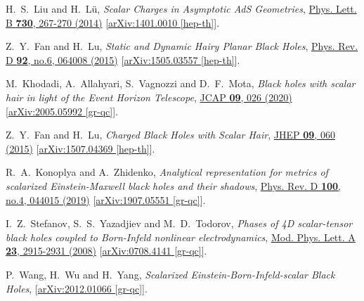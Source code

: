\documentclass[pr, twocolumn, preprintnumbers, showpacs,footnoteadded, superscriptaddress,nofootinbib,longbibliography]{revtex4-1}
\begin{document}
\begin{thebibliography}{99}
H.~S.~Liu and H.~L\"u,
\emph{Scalar Charges in Asymptotic AdS Geometries},
\href{https://www.sciencedirect.com/science/article/pii/S0370269314000781?via3Dihub}{Phys. Lett. B \textbf{730}, 267-270 (2014)}
[\href{https://arxiv.org/pdf/1401.0010.pdf}{arXiv:1401.0010 [hep-th]}].

Z.~Y.~Fan and H.~Lu,
\emph{Static and Dynamic Hairy Planar Black Holes},
\href{https://journals.aps.org/prd/abstract/10.1103/PhysRevD.92.064008}{Phys. Rev. D \textbf{92}, no.6, 064008 (2015)}
[\href{https://arxiv.org/pdf/1505.03557.pdf}{arXiv:1505.03557 [hep-th]}].

M.~Khodadi, A.~Allahyari, S.~Vagnozzi and D.~F.~Mota,
\emph{Black holes with scalar hair in light of the Event Horizon Telescope},
\href{https://doi.org/10.1088/1475-7516/2020/09/026}{JCAP \textbf{09}, 026 (2020)}
[\href{https://arxiv.org/pdf/2005.05992.pdf}{arXiv:2005.05992 [gr-qc]}].

Z.~Y.~Fan and H.~Lu,
\emph{Charged Black Holes with Scalar Hair},
\href{https://link.springer.com/article/10.1007/JHEP09(2015)060}{JHEP \textbf{09}, 060 (2015)}
[\href{https://arxiv.org/pdf/1507.04369.pdf}{arXiv:1507.04369 [hep-th]}].


R.~A.~Konoplya and A.~Zhidenko,
\emph{Analytical representation for metrics of scalarized Einstein-Maxwell black holes and their shadows},
\href{https://journals.aps.org/prd/abstract/10.1103/PhysRevD.100.044015}{Phys. Rev. D \textbf{100}, no.4, 044015 (2019)}
[\href{https://arxiv.org/pdf/1907.05551.pdf}{arXiv:1907.05551 [gr-qc]}].

I.~Z.~Stefanov, S.~S.~Yazadjiev and M.~D.~Todorov,
\emph{Phases of 4D scalar-tensor black holes coupled to Born-Infeld nonlinear electrodynamics},
\href{https://www.worldscientific.com/doi/abs/10.1142/S0217732308028351}{Mod. Phys. Lett. A \textbf{23}, 2915-2931 (2008)}
[\href{https://arxiv.org/pdf/0708.4141.pdf}{arXiv:0708.4141 [gr-qc]}].

P.~Wang, H.~Wu and H.~Yang,
\emph{Scalarized Einstein-Born-Infeld-scalar Black Holes},
[\href{https://arxiv.org/pdf/2012.01066.pdf}{arXiv:2012.01066 [gr-qc]}].


\end{thebibliography}
\end{document}
